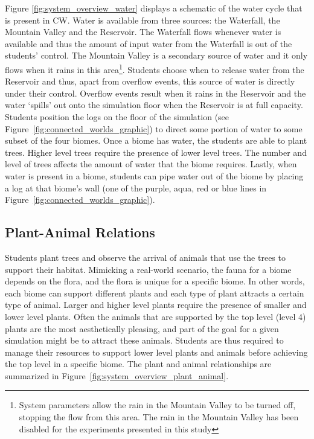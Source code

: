 Figure \ref{fig:system_overview_water} displays a schematic of the water cycle that is present in CW. Water is available from three sources: the Waterfall, the Mountain Valley and the Reservoir. The Waterfall flows whenever water is available and thus the amount of input water from the Waterfall is out of the students' control. The Mountain Valley is a secondary source of water and it only flows when it rains in this area\footnote{System parameters allow the rain in the Mountain Valley to be turned off, stopping the flow from this area. The rain in the Mountain Valley has been disabled for the experiments presented in this study}. Students choose when to release water from the Reservoir and thus, apart from overflow events, this source of water is directly under their control. Overflow events result when it rains in the Reservoir and the water `spills' out onto the simulation floor when the Reservoir is at full capacity. Students position the logs on the floor of the simulation (see Figure~\ref{fig:connected_worlds_graphic}) to direct some portion of water to some subset of the four biomes. Once a biome has water, the students are able to plant trees. Higher level trees require the presence of lower level trees. The number and level of trees affects the amount of water that the biome requires. Lastly, when water is present in a biome, students can pipe water out of the biome by placing a log at that biome's wall (one of the purple, aqua, red or blue lines in Figure~\ref{fig:connected_worlds_graphic}).



\subsection{Plant-Animal Relations}

Students plant trees and observe the arrival of animals that use the trees to support their habitat. Mimicking a real-world scenario, the fauna for a biome depends on the flora, and the flora is unique for a specific biome. In other words, each biome can support different plants and each type of plant attracts a certain type of animal. Larger and higher level plants require the presence of smaller and lower level plants. Often the animals that are supported by the top level (level 4) plants are the most aesthetically pleasing, and part of the goal for a given simulation might be to attract these animals. Students are thus required to manage their resources to support lower level plants and animals before achieving the top level in a specific biome. The plant and animal relationships are summarized in Figure~\ref{fig:system_overview_plant_animal}.

